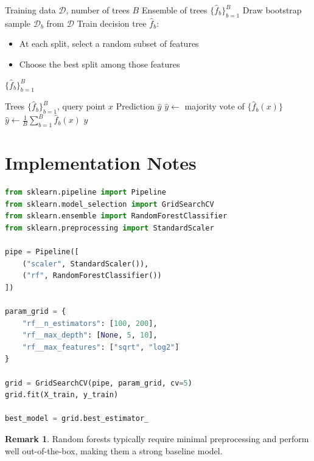 \documentclass[12pt,oneside]{book}
\numberwithin{equation}{section}
\theoremstyle{definition}
\newtheorem{remark}{Remark}[section]
\theoremstyle{plain}
\theoremstyle{remark}
\begin{document}
\begin{algorithm}[H]
\caption{Random Forest Training}
\begin{algorithmic}[1]
\Require Training data $\mathcal{D}$, number of trees $B$
\Ensure Ensemble of trees $\{\hat{f}_b\}_{b=1}^B$
    \State Draw bootstrap sample $\mathcal{D}_b$ from $\mathcal{D}$
    \State Train decision tree $\hat{f}_b$:
    \begin{itemize}
        \item At each split, select a random subset of features
        \item Choose the best split among those features
    \end{itemize}
\EndFor
\State \Return $\{\hat{f}_b\}_{b=1}^B$
\end{algorithmic}
\end{algorithm}

\begin{algorithm}[H]
\caption{Random Forest Prediction}
\begin{algorithmic}[1]
\Require Trees $\{\hat{f}_b\}_{b=1}^B$, query point $x$
\Ensure Prediction $\hat{y}$
    \State $\hat{y} \gets$ majority vote of $\{\hat{f}_b(x)\}$
\Else
    \State $\hat{y} \gets \frac{1}{B}\sum_{b=1}^B \hat{f}_b(x)$
\EndIf
\State \Return $\hat{y}$
\end{algorithmic}
\end{algorithm}

\section{Implementation Notes}

\begin{lstlisting}[language=Python]
from sklearn.pipeline import Pipeline
from sklearn.model_selection import GridSearchCV
from sklearn.ensemble import RandomForestClassifier
from sklearn.preprocessing import StandardScaler

pipe = Pipeline([
    ("scaler", StandardScaler()),
    ("rf", RandomForestClassifier())
])

param_grid = {
    "rf__n_estimators": [100, 200],
    "rf__max_depth": [None, 5, 10],
    "rf__max_features": ["sqrt", "log2"]
}

grid = GridSearchCV(pipe, param_grid, cv=5)
grid.fit(X_train, y_train)

best_model = grid.best_estimator_
\end{lstlisting}

\begin{remark}
Random forests typically require minimal preprocessing and perform well out-of-the-box, making them a strong baseline model.
\end{remark}
\end{document}
